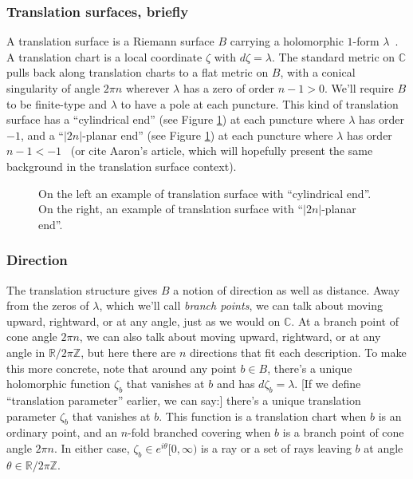 \documentclass{article}
\theoremstyle{definition}
\newcommand{\Z}{\mathbb{Z}}
\newcommand{\R}{\mathbb{R}}
\newcommand{\C}{\mathbb{C}}
\theoremstyle{plain}
\begin{document}
\subsubsection{Translation surfaces, briefly}
%
A translation surface is a Riemann surface $B$ carrying a holomorphic $1$-form $\lambda$~\cite{zorich2006flat}. A translation chart is a local coordinate $\zeta$ with $d\zeta = \lambda$. The standard metric on $\C$ pulls back along translation charts to a flat metric on $B$, with a conical singularity of angle $2\pi n$ wherever $\lambda$ has a zero of order $n-1 > 0$. We'll require $B$ to be finite-type and $\lambda$ to have a pole at each puncture. This kind of translation surface has a ``cylindrical end'' (see Figure \ref{fig:translation_surface}) at each puncture where $\lambda$ has order $-1$, and a ``$|2n|$-planar end'' (see Figure \ref{fig:translation_surface}) at each puncture where $\lambda$ has order $n-1 < -1$~\cite[Section 2.5]{gupta2013meromorphic} (or cite Aaron's article, which will hopefully present the same background in the translation surface context).
\begin{figure}[ht]
    \centering
    \caption{On the left an example of translation surface with ``cylindrical end''. On the right, an example of translation surface with  ``$|2n|$-planar end''. }
    \label{fig:translation_surface}
\end{figure}
%
\subsubsection{Direction}\label{transl:dir}
%
The translation structure gives $B$ a notion of direction as well as distance. Away from the zeros of $\lambda$, which we'll call {\em branch points}, we can talk about moving upward, rightward, or at any angle, just as we would on $\C$. At a branch point of cone angle $2\pi n$, we can also talk about moving upward, rightward, or at any angle in $\R/2\pi\Z$, but here there are $n$ directions that fit each description. To make this more concrete, note that around any point $b \in B$, there's a unique holomorphic function $\zeta_b$ that vanishes at $b$ and has $d\zeta_b = \lambda$. \textcolor{VioletRed}{[If we define ``translation parameter'' earlier, we can say:] there's a unique translation parameter $\zeta_b$ that vanishes at $b$.} This function is a translation chart when $b$ is an ordinary point, and an $n$-fold branched covering when $b$ is a branch point of cone angle $2\pi n$. In either case, $\zeta_b \in e^{i\theta} [0, \infty)$ is a ray or a set of rays leaving $b$ at angle $\theta \in \R/2\pi\Z$.
%
\end{document}
